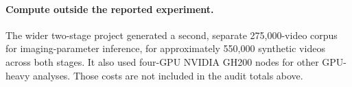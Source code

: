 \documentclass{article}
\begin{document}
\paragraph{Compute outside the reported experiment.} The wider two-stage
project generated a second, separate 275,000-video corpus for imaging-parameter
inference, for approximately 550,000 synthetic videos across both stages. It
also used four-GPU NVIDIA GH200 nodes for other GPU-heavy analyses. Those costs
are not included in the audit totals above.
\end{document}
